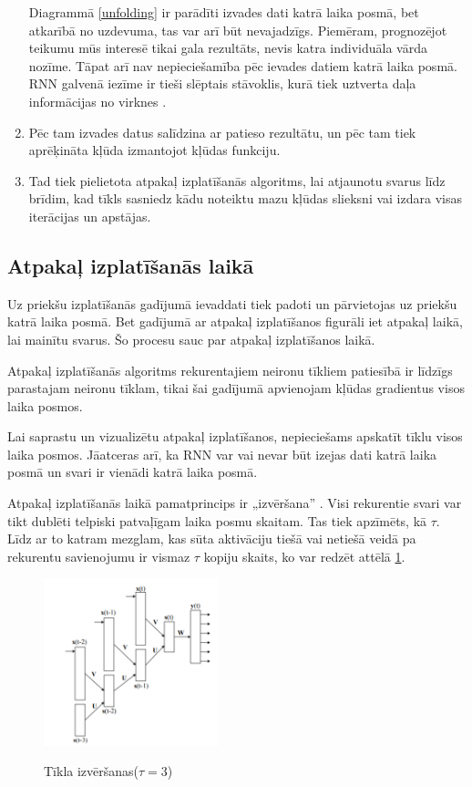 \documentclass[12pt,paper=A4]{report}
\begin{document}
\begin{enumerate}
Diagrammā \ref{unfolding} ir parādīti izvades dati katrā laika posmā, bet atkarībā no uzdevuma, tas var arī būt nevajadzīgs. Piemēram, prognozējot teikumu mūs interesē tikai gala rezultāts, nevis katra individuāla vārda nozīme. Tāpat arī nav nepieciešamība pēc ievades datiem katrā laika posmā. RNN galvenā iezīme ir tieši slēptais stāvoklis, kurā tiek uztverta daļa informācijas no virknes \cite{http://www.wildml.com/2015/09/recurrent-neural-networks-tutorial-part-1-introduction-to-rnns/}.    
    
    \item Pēc tam izvades datus salīdzina ar patieso rezultātu, un pēc tam tiek aprēķināta kļūda izmantojot kļūdas funkciju.
    
   \item  Tad tiek pielietota atpakaļ izplatīšanās algoritms, lai atjaunotu svarus līdz brīdim, kad tīkls sasniedz kādu noteiktu mazu kļūdas slieksni vai izdara visas iterācijas un apstājas.    
    \end{enumerate}
     
	
 \subsection{Atpakaļ izplatīšanās laikā}

Uz priekšu izplatīšanās gadījumā ievaddati tiek padoti un pārvietojas uz priekšu katrā laika posmā. Bet gadījumā ar atpakaļ izplatīšanos figurāli iet atpakaļ laikā, lai mainītu svarus. Šo procesu sauc par atpakaļ izplatīšanos laikā.

Atpakaļ izplatīšanās algoritms rekurentajiem neironu tīkliem patiesībā ir līdzīgs parastajam neironu tīklam, tikai šai gadījumā apvienojam kļūdas gradientus visos laika posmos. 

Lai saprastu un vizualizētu atpakaļ izplatīšanos, nepieciešams apskatīt tīklu visos laika posmos. Jāatceras arī, ka RNN var vai nevar būt izejas dati katrā laika posmā un svari ir vienādi katrā laika posmā. 

Atpakaļ izplatīšanās laikā pamatprincips ir „izvēršana” \cite{bptt}. Visi rekurentie svari var tikt dublēti telpiski patvaļīgam laika posmu skaitam. Tas tiek apzīmēts, kā $\tau$. Līdz ar to katram mezglam, kas sūta aktivāciju tiešā vai netiešā veidā pa rekurentu savienojumu ir vismaz $\tau$ kopiju skaits, ko var redzēt attēlā \ref{bptt}. 

\begin{figure}[H] \centering
\includegraphics[width=0.45\textwidth]{bpttime} 
\caption{Tīkla izvēršanas($\tau = 3$)} \cite{bptt}  \label{bptt} 
\end{figure}
\end{document}

